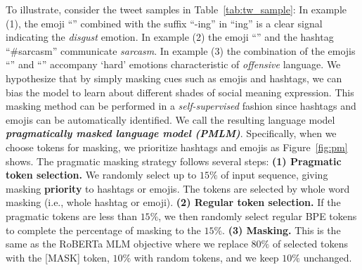To illustrate, consider the tweet samples in Table~\ref{tab:tw_sample}: In example (1), the emoji ``\emojisick'' combined with the suffix ``-ing'' in ``\emojisick ing'' is a clear signal indicating the \textit{disgust} emotion. In example (2) the emoji ``\emojiupsidedown'' and the hashtag ``\#sarcasm'' communicate \textit{sarcasm}. In example (3) the combination of the emojis ``\emojidispoint'' and ``\emojianger'' accompany `hard' emotions characteristic of \textit{offensive} language. We hypothesize that by simply masking cues such as emojis and hashtags, we can bias the model to learn about different shades of social meaning expression. This masking method can be performed in a \textit{self-supervised} fashion since hashtags and emojis can be automatically identified. We call the resulting language model \textbf{\textit{pragmatically masked language model (PMLM)}}. Specifically, when we choose tokens for masking, we prioritize hashtags and emojis as Figure~\ref{fig:pm} shows.
The pragmatic masking strategy follows several steps:
\noindent \textbf{(1) Pragmatic token selection.} %
We randomly select up to $15\%$ of input sequence, giving masking \textbf{priority} to hashtags or emojis. The tokens are selected by whole word masking (i.e., whole hashtag or emoji). \noindent \textbf{(2) Regular token selection.} If the pragmatic tokens are less than $15\%$, we then randomly select regular BPE tokens to complete the percentage of masking to the $15\%$. \noindent \textbf{(3) Masking.} This is the same as the RoBERTa MLM objective where we replace $80\%$ of selected tokens with the [MASK] token, $10\%$ with random tokens, and we keep $10\%$ unchanged. 


